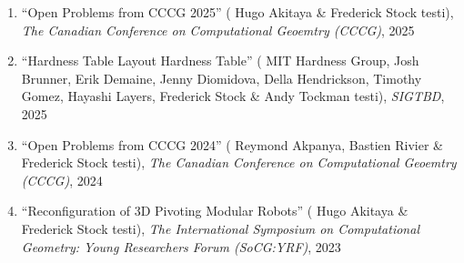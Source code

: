 \documentclass[letterpaper,11pt]{article}
\makeatletter
\newcommand{\resumeSubHeadingListEnd}{\end{itemize}}
\newcommand{\publication}[6]{
  \item ``#1'' %
   (\ignorespaces#2 testi), %
     \emph{#3}, %
      #4%


}
\newcommand{\pdficon}{\faFilePdf}
\newcommand{\doilabel}{\texttt{DOI}}
\makeatother
\begin{document}
    \begin{enumerate}
    \setcounter{enumi}{\value{pubnum}}
      
        \publication
          {Open Problems from CCCG 2025}
          {
 Hugo Akitaya \& Frederick Stock}
          {The Canadian Conference on Computational Geoemtry (CCCG)}
          {2025}
          {%
\href{fred-stock.github.io/docstore/}{\pdficon}%
%
%
          }
          {1}
 \vspace{-.5em}  
      
        \publication
          {Hardness Table Layout Hardness Table}
          {
 MIT Hardness Group, Josh Brunner, Erik Demaine, Jenny Diomidova, Della Hendrickson, Timothy Gomez, Hayashi Layers, Frederick Stock \& Andy Tockman}
          {SIGTBD}
          {2025}
          {%
\href{fred-stock.github.io/docstore/hardness-table-layout-SIGTBD.pdf}{\pdficon}%
%
%
          }
          {2}
 \vspace{-.5em}  
      
        \publication
          {Open Problems from CCCG 2024}
          {
 Reymond Akpanya, Bastien Rivier \& Frederick Stock}
          {The Canadian Conference on Computational Geoemtry (CCCG)}
          {2024}
          {%
\href{fred-stock.github.io/docstore/CCCG_Open_Problems-2024.pdf}{\pdficon}%
%
%
          }
          {3}
 \vspace{-.5em}  
      
        \publication
          {Reconfiguration of 3D Pivoting Modular Robots}
          {
 Hugo Akitaya \& Frederick Stock}
          {The International Symposium on Computational Geometry: Young Researchers Forum (SoCG:YRF)}
          {2023}
          {%
\href{fred-stock.github.io/docstore/Reconfiguration-3D-Pivoting-MR-SOCGYRF.pdf}{\pdficon}%
%
\quad\href{https://doi.org/10.48550/arXiv.2304.09990}{\doilabel}%
          }
          {4}
 
    \setcounter{pubnum}{\value{enumi}}
    \end{enumerate}

\end{document}
